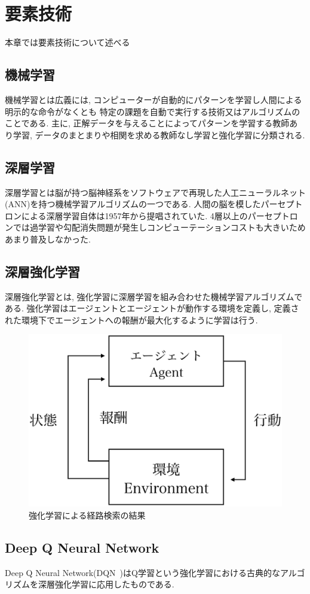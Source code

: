 \chapter{要素技術}
\label{technical_background}

本章では要素技術について述べる


\section{機械学習}

機械学習とは広義には, コンピューターが自動的にパターンを学習し人間による明示的な命令がなくとも
特定の課題を自動で実行する技術又はアルゴリズムのことである. 主に, 正解データを与えることによってパターンを学習する教師あり学習, データのまとまりや相関を求める教師なし学習と強化学習に分類される.


\section{深層学習}

深層学習とは脳が持つ脳神経系をソフトウェアで再現した人工ニューラルネット(ANN)を持つ機械学習アルゴリズムの一つである. 
人間の脳を模したパーセプトロンによる深層学習自体は1957年から提唱されていた. 4層以上のパーセプトロンでは過学習や勾配消失問題が発生しコンピューテーションコストも大きいためあまり普及しなかった.

\section{深層強化学習}

深層強化学習とは, 強化学習に深層学習を組み合わせた機械学習アルゴリズムである.
強化学習はエージェントとエージェントが動作する環境を定義し, 定義された環境下でエージェントへの報酬が最大化するように学習は行う.


\begin{figure}[H]
    \centering  %
    \includegraphics[clip,width = 12.0cm]{assets/reinforcement_learning.eps}
    \caption{強化学習による経路検索の結果}  \label{sample}
\end{figure}

\section{Deep Q Neural Network}

Deep Q Neural Network(DQN~\cite{DQN})はQ学習という強化学習における古典的なアルゴリズムを深層強化学習に応用したものである.


